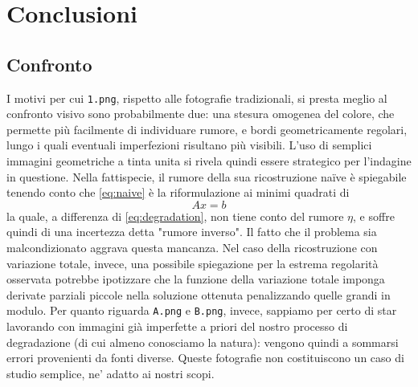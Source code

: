\documentclass[a4paper]{article}
\begin{document}
\section{Conclusioni}

\subsection{Confronto}
I motivi per cui \verb!1.png!, rispetto alle fotografie tradizionali, si presta
meglio al confronto visivo sono probabilmente due: una stesura omogenea del
colore, che permette più facilmente di individuare rumore, e bordi
geometricamente regolari, lungo i quali eventuali imperfezioni risultano più
visibili. L'uso di semplici immagini geometriche a tinta unita si rivela quindi
essere strategico per l'indagine in questione. Nella fattispecie, il rumore
della sua ricostruzione naïve è spiegabile tenendo conto che \eqref{eq:naive} è
la riformulazione ai minimi quadrati di
\begin{equation}
  Ax = b
\end{equation}
la quale, a differenza di \eqref{eq:degradation}, non tiene conto del rumore
$\eta$, e soffre quindi di una incertezza detta "rumore inverso". Il fatto che
il problema sia malcondizionato aggrava questa mancanza. Nel caso della
ricostruzione con variazione totale, invece, una possibile spiegazione per la
estrema regolarità osservata potrebbe ipotizzare che la funzione della
variazione totale imponga derivate parziali piccole nella soluzione ottenuta
penalizzando quelle grandi in modulo. Per quanto riguarda \verb!A.png! e
\verb!B.png!, invece, sappiamo per certo di star lavorando con immagini già
imperfette a priori del nostro processo di degradazione (di cui almeno
conosciamo la natura): vengono quindi a sommarsi errori provenienti da fonti
diverse. Queste fotografie non costituiscono un caso di studio semplice,
ne' adatto ai nostri scopi.
\end{document}
